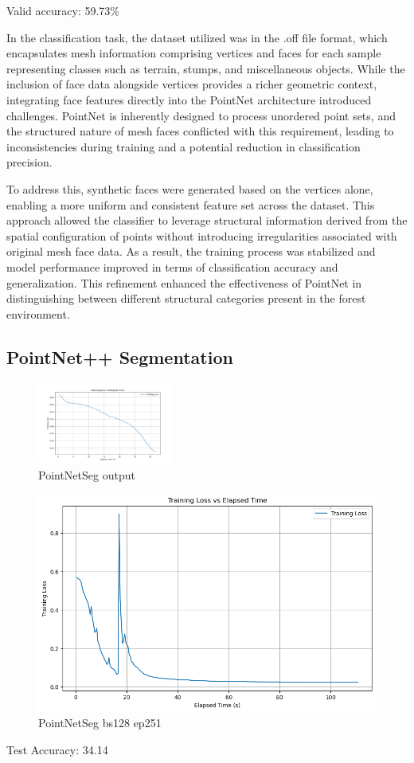 \documentclass[../report.tex]{subfiles}
\begin{document}
    Valid accuracy:  59.73\%
    
    In the classification task, the dataset utilized was in the .off file format, which encapsulates mesh information comprising vertices and faces for each sample representing classes such as terrain, stumps, and miscellaneous objects. While the inclusion of face data alongside vertices provides a richer geometric context, integrating face features directly into the PointNet architecture introduced challenges. PointNet is inherently designed to process unordered point sets, and the structured nature of mesh faces conflicted with this requirement, leading to inconsistencies during training and a potential reduction in classification precision.
    
    To address this, synthetic faces were generated based on the vertices alone, enabling a more uniform and consistent feature set across the dataset. This approach allowed the classifier to leverage structural information derived from the spatial configuration of points without introducing irregularities associated with original mesh face data. As a result, the training process was stabilized and model performance improved in terms of classification accuracy and generalization. This refinement enhanced the effectiveness of PointNet in distinguishing between different structural categories present in the forest environment.
\subsection{PointNet++ Segmentation}
\begin{figure}[H]
    \centering
    \includegraphics[width=0.4\textwidth]{rnd-project-report-main/figures/PointNetSeg_output.png}
    \caption{PointNetSeg output}
\end{figure}

\begin{figure}
    \centering
    \includegraphics[width=0.7\linewidth]{rnd-project-report-main//figures/PointNetSeg_bs128_ep251.png}
    \caption{PointNetSeg bs128 ep251}
    \label{fig:enter-label}
\end{figure}
Test Accuracy: 34.14%
\end{document}
